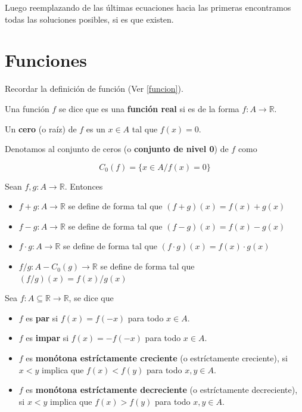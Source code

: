 Luego reemplazando de las últimas ecuaciones hacia las primeras encontramos todas las soluciones posibles, si es que existen.



\chapter{Funciones}

Recordar la definición de función (Ver \ref{funcion}).

\begin{definition} 
Una función $f$ se dice que es una \textbf{función real} si es de la forma $f : A \to \mathbb{R}$.  

Un \textbf{cero}  (o raíz) de $f$ es un $x \in A$ tal que $f(x) = 0$.

Denotamos al conjunto de ceros (o \textbf{conjunto de nivel 0}) de $f$ como

$$ C_0(f) = \{x \in A / f(x) = 0 \} $$

\end{definition}

\begin{definition} 

Sean $f, g : A \to \mathbb{R}$.  Entonces

\begin{itemize}
\item $f+g : A \to \mathbb{R}$ se define de forma tal que $(f+g)(x) = f(x) + g(x)$
\item $f-g : A \to \mathbb{R}$ se define de forma tal que $(f-g)(x) = f(x) - g(x)$
\item $f \cdot g : A \to \mathbb{R}$ se define de forma tal que $(f \cdot g)(x) = f(x) \cdot g(x)$
\item $f/g : A - C_0(g) \to \mathbb{R}$ se define de forma tal que $(f / g)(x) = f(x) / g(x)$
\end{itemize}
\end{definition}

\begin{definition} 

Sea $f : A \subseteq \mathbb{R} \to \mathbb{R}$, se dice que

\begin{itemize}
\item $f$ es \textbf{par} si $f(x) = f(-x)$ para todo $x \in A$.
\item $f$ es \textbf{impar} si $f(x) = -f(-x)$ para todo $x \in A$.
\item $f$ es \textbf{monótona estríctamente creciente} (o estríctamente creciente), si $x < y$ implica que $f(x) < f(y)$ para todo $x,y \in A$.
\item $f$ es \textbf{monótona estríctamente decreciente} (o estríctamente decreciente), si $x < y$ implica que $f(x) > f(y)$ para todo $x,y \in A$.

\end{itemize}

\end{definition}

